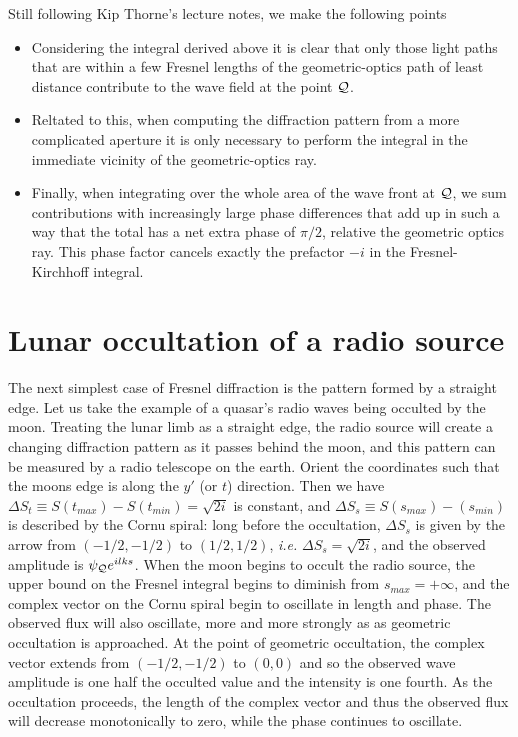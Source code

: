 Still following Kip Thorne's lecture notes, we make the following points

\begin{itemize}
\item Considering the integral derived above it is clear that only those light paths that 
are within a few Fresnel lengths of the geometric-optics path of least distance contribute
to the wave field at the point $\cal{Q}$.
\item Reltated to this, when computing the diffraction pattern from a more complicated 
aperture it is only necessary to perform the integral in the immediate vicinity of the 
geometric-optics ray. 
\item Finally, when integrating over the whole area of the wave front at $\cal{Q}$, we sum 
contributions with increasingly large phase differences that add up in such a way that the 
total has a net extra phase of $\pi/2$, relative the geometric optics ray. This phase factor
cancels exactly the prefactor $-i$ in the Fresnel-Kirchhoff integral.
\end{itemize}

\section{Lunar occultation of a radio source}

The next simplest case of Fresnel diffraction is the pattern formed by a straight 
edge. Let us take the example of a quasar's radio waves being occulted by the 
moon.
Treating the lunar limb as a straight edge, the radio source will create
a changing diffraction pattern as it passes behind the moon, and this pattern
can be measured by a radio telescope on the earth. Orient the coordinates
such that the moons edge is along the $y'$ (or $t$) direction. Then we have
$\Delta S_t\equiv S(t_{max})-S(t_{min})=\sqrt{2i}$ is constant, and 
$\Delta S_s\equiv S(s_{max})-(s_{min})$ is described by the Cornu spiral: long
before the occultation, $\Delta S_s$ is given by the arrow from $(-{1/2},-{1/2})$
to $({1/2},{1/2})$, {\it i.e.} $\Delta S_s=\sqrt{2i}$, and the observed amplitude
is $\psi_{\cal{Q}}e^{ilks}$. When the moon begins to occult the radio source, the
upper bound on the Fresnel integral begins to diminish from $s_{max}=+\infty$, 
and the complex vector on the Cornu spiral begin to oscillate in length and 
phase. The observed flux will also oscillate, more and more strongly as as 
geometric occultation is approached. At the point of geometric occultation, the
complex vector extends from $(-{1/2},-{1/2})$ to $(0,0)$ and so the observed
wave amplitude is one half the occulted value and the intensity is one fourth. 
As the occultation proceeds, the length of the complex vector and thus the 
observed flux will decrease monotonically to zero, while the phase continues to
oscillate.

